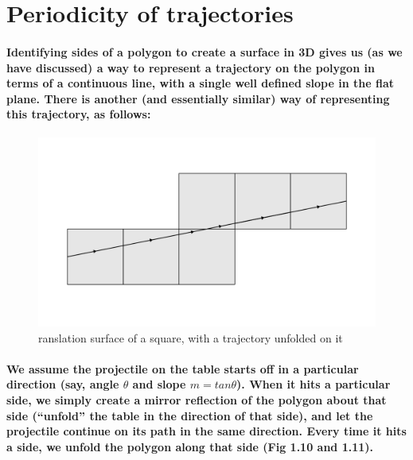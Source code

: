 \documentclass{report}
\begin{document}
\section{Periodicity of trajectories}





\paragraph{Identifying sides of a polygon to create a surface in 3D gives us (as we have discussed) a way to represent a trajectory on the polygon in terms of a continuous line, with a single well defined slope in the flat plane. There is another (and essentially similar) way of representing this trajectory, as follows:}

\begin{figure} 
\begin{center}
\includegraphics[scale=0.3]{9}
\caption{ranslation surface of a square, with a trajectory unfolded on it}
\end{center}
\end{figure}

\paragraph{We assume the projectile on the table starts off in a particular direction (say, angle $\theta$ and slope $m = tan\theta$). When it hits a particular side, we simply create a mirror reflection of the polygon about that side (“unfold” the table in the direction of that side), and let the projectile continue on its path in the same direction. Every time it hits a side, we unfold the polygon along that side (Fig 1.10 and 1.11).\\ \\ \\ \\ \\}
\end{document}
